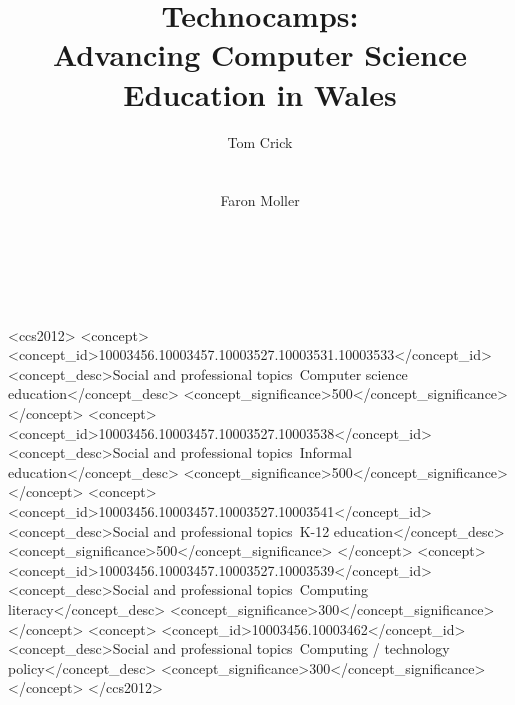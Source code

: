 \documentclass{sig-alternate}
\begin{document}

\begin{CCSXML}
<ccs2012>
<concept>
<concept_id>10003456.10003457.10003527.10003531.10003533</concept_id>
<concept_desc>Social and professional topics~Computer science education</concept_desc>
<concept_significance>500</concept_significance>
</concept>
<concept>
<concept_id>10003456.10003457.10003527.10003538</concept_id>
<concept_desc>Social and professional topics~Informal education</concept_desc>
<concept_significance>500</concept_significance>
</concept>
<concept>
<concept_id>10003456.10003457.10003527.10003541</concept_id>
<concept_desc>Social and professional topics~K-12 education</concept_desc>
<concept_significance>500</concept_significance>
</concept>
<concept>
<concept_id>10003456.10003457.10003527.10003539</concept_id>
<concept_desc>Social and professional topics~Computing literacy</concept_desc>
<concept_significance>300</concept_significance>
</concept>
<concept>
<concept_id>10003456.10003462</concept_id>
<concept_desc>Social and professional topics~Computing / technology policy</concept_desc>
<concept_significance>300</concept_significance>
</concept>
</ccs2012>
\end{CCSXML}


\title{Technocamps:\\Advancing Computer Science Education in Wales}

 \author{
 \alignauthor
 Tom Crick\\
 \\
 \\
 \alignauthor
 Faron Moller\\
 \\
 \\
 \\
 }
\end{document}
